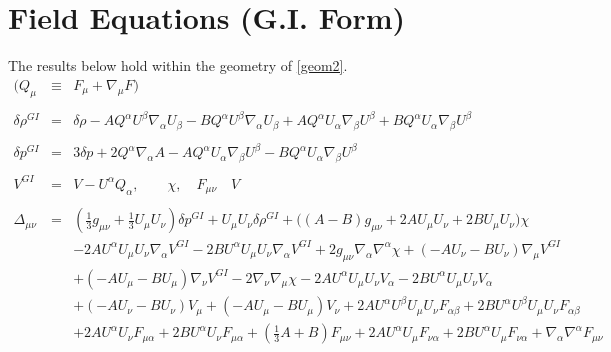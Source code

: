 \documentclass[10pt,letterpaper]{article}
\numberwithin{equation}{section}
\begin{document}
\section{Field Equations (G.I. Form)}
%
The results below hold within the geometry of \eqref{geom2}. 
\begin{eqnarray}
(Q_\mu  &\equiv& F_\mu + \nabla_\mu F)
\\ \nonumber\\
\delta \rho^{GI}{} &=& \delta \rho -  A Q^{\alpha } U^{\beta } \nabla_{\alpha }U_{\beta } -  B Q^{\alpha } U^{\beta } \nabla_{\alpha }U_{\beta } + A Q^{\alpha } U_{\alpha } \nabla_{\beta }U^{\beta } + B Q^{\alpha } U_{\alpha } \nabla_{\beta }U^{\beta }
\label{rhogi}
\\ \nonumber\\
\delta p^{GI}{} &=& 3 \delta p + 2 Q^{\alpha } \nabla_{\alpha }A -  A Q^{\alpha } U_{\alpha } \nabla_{\beta }U^{\beta } -  B Q^{\alpha } U_{\alpha } \nabla_{\beta }U^{\beta }
\label{pgi}
\\ \nonumber\\
V^{GI}&=& V-U^\alpha Q_\alpha,\qquad \chi,\quad F_{\mu\nu}\quad V 
\\ \nonumber\\
\Delta_{\mu\nu}&=& (\tfrac{1}{3} g_{\mu \nu } + \tfrac{1}{3} U_{\mu } U_{\nu }) \delta p^{GI}{} + U_{\mu } U_{\nu } \delta \rho^{GI}{} + \bigl((A -  B) g_{\mu \nu } + 2 A U_{\mu } U_{\nu } + 2 B U_{\mu } U_{\nu }\bigr) \chi \nonumber \\ 
&& - 2 A U^{\alpha } U_{\mu } U_{\nu } \nabla_{\alpha }V^{GI}{} - 2 B U^{\alpha } U_{\mu } U_{\nu } \nabla_{\alpha }V^{GI}{} + 2 g_{\mu \nu } \nabla_{\alpha }\nabla^{\alpha }\chi + (- A U_{\nu } -  B U_{\nu }) \nabla_{\mu }V^{GI}{} \nonumber \\ 
&& + (- A U_{\mu } -  B U_{\mu }) \nabla_{\nu }V^{GI}{} - 2 \nabla_{\nu }\nabla_{\mu }\chi -2 A U^{\alpha } U_{\mu } U_{\nu } V_{\alpha } - 2 B U^{\alpha } U_{\mu } U_{\nu } V_{\alpha } \nonumber \\ 
&& + (- A U_{\nu } -  B U_{\nu }) V_{\mu } + (- A U_{\mu } -  B U_{\mu }) V_{\nu }+2 A U^{\alpha } U^{\beta } U_{\mu } U_{\nu } F_{\alpha \beta } + 2 B U^{\alpha } U^{\beta } U_{\mu } U_{\nu } F_{\alpha \beta } \nonumber \\ 
&& + 2 A U^{\alpha } U_{\nu } F_{\mu \alpha } + 2 B U^{\alpha } U_{\nu } F_{\mu \alpha } + (\tfrac{1}{3} A + B) F_{\mu \nu } + 2 A U^{\alpha } U_{\mu } F_{\nu \alpha } + 2 B U^{\alpha } U_{\mu } F_{\nu \alpha } + \nabla_{\alpha }\nabla^{\alpha }F_{\mu \nu }

\end{eqnarray}
\end{document}
